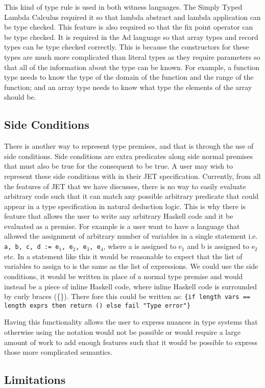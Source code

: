 This kind of type rule is used in both witness languages.
The Simply Typed Lambda Calculus required it so that lambda abstract and lambda application can be type checked.
This feature is also required so that the fix point operator can be type checked.
It is required in the Ad language so that array types and record types can be type checked correctly.
This is because the constructors for these types are much more complicated than literal types as they require parameters so that all of the information about the type can be known.
For example, a function type needs to know the type of the domain of the function and the range of the function; and an array type needs to know what type the elements of the array should be.


\subsection{Side Conditions}
There is another way to represent type premises, and that is through the use of side conditions.
Side conditions are extra predicates along side normal premises that must also be true for the consequent to be true.
A user may wish to represent these side conditions with in their JET specification.
Currently, from all the features of JET that we have discusses, there is no way to easily evaluate arbitrary code such that it can match any possible arbitrary predicate that could appear in a type specification in natural deduction logic.
This is why there is feature that allows the user to write any arbitrary Haskell code and it be evaluated as a premise.
For example is a user want to have a language that allowed the assignment of arbitrary number of variables in a single statement i.e. \texttt{a, b, c, d := e$_1$, e$_2$, e$_3$, e$_4$}, where a is assigned to e$_1$ and b is assigned to e$_2$ etc.
In a statement like this it would be reasonable to expect that the list of variables to assign to is the same as the list of expressions.
We could use the side conditions, it would be written in place of a normal type premise and would instead be a piece of inline Haskell code, where inline Haskell code is surrounded by curly braces (\{\}).
There fore this could be written as: \texttt{\{if length vars == length exprs then return () else fail "Type error"\}}

Having this functionality allows the user to express nuances in type systems that otherwise using the notation would not be possible or would require a large amount of work to add enough features such that it would be possible to express those more complicated semantics.

\subsection{Limitations}
